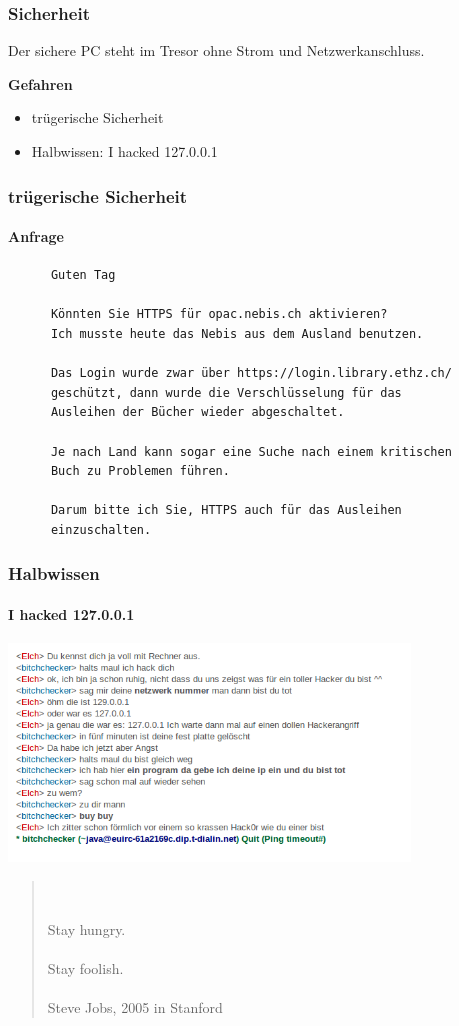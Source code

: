 \begin{frame}
  \frametitle{Sicherheit}
    \begin{theorem}
      Der sichere PC steht im Tresor ohne Strom und Netzwerkanschluss.
    \end{theorem}
    \textbf{Gefahren}
    \begin{itemize}
       \item trügerische Sicherheit
       \item Halbwissen: I hacked 127.0.0.1
    \end{itemize}
\end{frame}

\begin{frame}[fragile]
  \frametitle{trügerische Sicherheit}
  \framesubtitle{Anfrage}
    \begin{lstlisting}
      Guten Tag

      Könnten Sie HTTPS für opac.nebis.ch aktivieren?
      Ich musste heute das Nebis aus dem Ausland benutzen.

      Das Login wurde zwar über https://login.library.ethz.ch/
      geschützt, dann wurde die Verschlüsselung für das 
      Ausleihen der Bücher wieder abgeschaltet.

      Je nach Land kann sogar eine Suche nach einem kritischen
      Buch zu Problemen führen.

      Darum bitte ich Sie, HTTPS auch für das Ausleihen 
      einzuschalten.
    \end{lstlisting}
\end{frame}

\begin{frame}[c]\frametitle{Halbwissen}
    \framesubtitle{I hacked 127.0.0.1}
    \begin{center}
      \includegraphics[width=0.8\textwidth]{pics/halbwissen}
    \end{center}
\end{frame}

\begin{frame}[c]
  \begin{quote}
    \begin{center}
      \\
      \bigskip
      \\
      {\huge Stay hungry.}
      \\
      \medskip
      \\
      {\huge Stay foolish.}
       \\
      \bigskip
      \\
      \hfill{Steve Jobs, 2005 in Stanford}
    \end{center}
  \end{quote}
\end{frame}